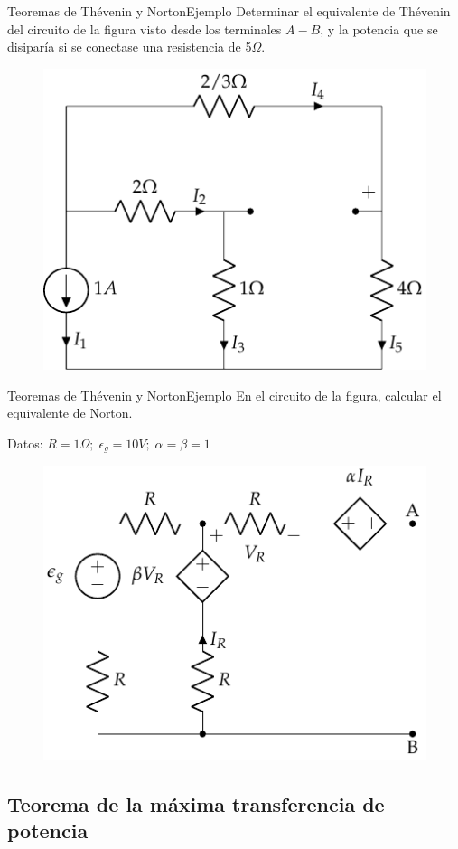 \documentclass[aspectratio=169, xcolor={usenames,svgnames,dvipsnames}]{beamer}
\begin{document}
\begin{frame}{Teoremas de Thévenin y Norton}{Ejemplo}
Determinar el equivalente de Thévenin del circuito de la figura visto desde los terminales $A-B$, y la potencia que se disiparía si se conectase una resistencia de 5$\Omega$.
    \begin{figure}[H]
        \centering
        \includegraphics{../figs/ej_Th_cc1.pdf}
    \end{figure}
\end{frame}

\begin{frame}{Teoremas de Thévenin y Norton}{Ejemplo}
    En el circuito de la figura, calcular el equivalente de Norton.

Datos: $R = {1}{\Omega};\; \epsilon_g = {10}{V};\; \alpha = \beta = 1$

\begin{figure}[H]
    \centering
    \includegraphics[width=0.45\linewidth]{../figs/ejemplo_norton.pdf}
\end{figure}
\end{frame}

\subsection{Teorema de la máxima transferencia de potencia}
\end{document}
